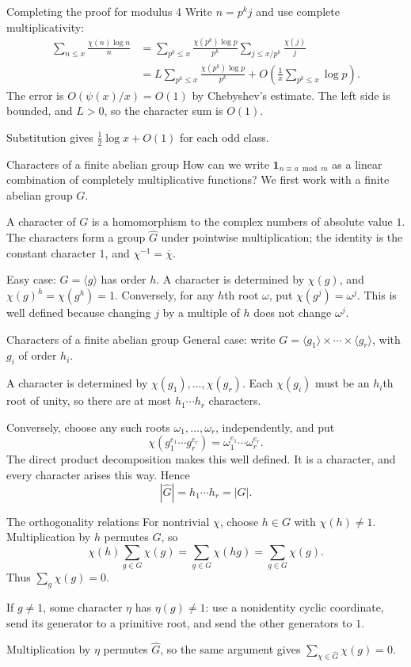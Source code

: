 \documentclass[aspectratio=169,11pt]{beamer}
\newcommand{\ind}{\mathbf1}
\begin{document}
\begin{frame}{Completing the proof for modulus 4}
Write $n=p^kj$ and use complete multiplicativity:
\begin{align*}
\sum_{n\le x}\frac{\chi(n)\log n}n
&=\sum_{p^k\le x}\frac{\chi(p^k)\log p}{p^k}\sum_{j\le x/p^k}\frac{\chi(j)}j\\
&=L\sum_{p^k\le x}\frac{\chi(p^k)\log p}{p^k}
+O\left(\frac1x\sum_{p^k\le x}\log p\right).
\end{align*}
The error is $O(\psi(x)/x)=O(1)$ by Chebyshev's estimate. The left side is bounded, and $L>0$, so the character sum is $O(1)$.

Substitution gives $\tfrac12\log x+O(1)$ for each odd class.
\end{frame}
\begin{frame}{Characters of a finite abelian group}
How can we write $\ind_{n\equiv a\bmod m}$ as a linear combination of completely multiplicative functions? We first work with a finite abelian group $G$.

A character of $G$ is a homomorphism to the complex numbers of absolute value $1$. The characters form a group $\widehat G$ under pointwise multiplication; the identity is the constant character $1$, and $\chi^{-1}=\overline\chi$.

Easy case: $G=\langle g\rangle$ has order $h$. A character is determined by $\chi(g)$, and $\chi(g)^h=\chi(g^h)=1$. Conversely, for any $h$th root $\omega$, put $\chi(g^j)=\omega^j$. This is well defined because changing $j$ by a multiple of $h$ does not change $\omega^j$.

\end{frame}
\begin{frame}{Characters of a finite abelian group}
General case: write $G=\langle g_1\rangle\times\cdots\times\langle g_r\rangle$, with $g_i$ of order $h_i$.

A character is determined by $\chi(g_1),\ldots,\chi(g_r)$. Each $\chi(g_i)$ must be an $h_i$th root of unity, so there are at most $h_1\cdots h_r$ characters.

Conversely, choose any such roots $\omega_1,\ldots,\omega_r$, independently, and put
\[\chi(g_1^{e_1}\cdots g_r^{e_r})=\omega_1^{e_1}\cdots\omega_r^{e_r}.\]
The direct product decomposition makes this well defined. It is a character, and every character arises this way. Hence
\[|\widehat G|=h_1\cdots h_r=|G|.\]
\end{frame}
\begin{frame}{The orthogonality relations}
For nontrivial $\chi$, choose $h\in G$ with $\chi(h)\ne1$. Multiplication by $h$ permutes $G$, so
\[\chi(h)\sum_{g\in G}\chi(g)=\sum_{g\in G}\chi(hg)=\sum_{g\in G}\chi(g).\]
Thus $\sum_g\chi(g)=0$.

If $g\ne1$, some character $\eta$ has $\eta(g)\ne1$: use a nonidentity cyclic coordinate, send its generator to a primitive root, and send the other generators to $1$.

Multiplication by $\eta$ permutes $\widehat G$, so the same argument gives $\sum_{\chi\in\widehat G}\chi(g)=0$.
\end{frame}
\end{document}
